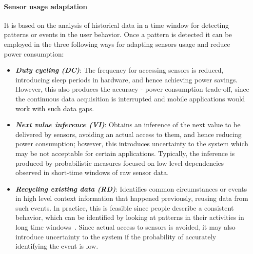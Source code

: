 \documentclass[ENG,PhD]{cinvestav}
\begin{document}
\paragraph{Sensor usage adaptation}
It is based on the analysis of historical data in a time window for detecting patterns or events in the user behavior.
Once a pattern is detected it can be employed in the three following ways for adapting sensors usage and reduce power consumption:
\begin{itemize}
  \item \emph{\textbf{Duty cycling (DC)}}:  The frequency for accessing sensors is reduced, introducing sleep periods in hardware, and hence achieving power savings.
  However, this also produces the accuracy - power consumption trade-off, since the continuous data acquisition is interrupted and mobile applications would work with such data gaps.
  \item \emph{\textbf{Next value inference (VI)}}: Obtains an inference of the next value to be delivered by sensors, avoiding an actual access to them, and hence reducing power consumption; however, this introduces uncertainty to the system which may be not acceptable for certain applications.
  Typically, the inference is produced by probabilistic measures focused on low level dependencies observed in short-time windows of raw sensor data.
  \item \emph{\textbf{Recycling existing data (RD)}}: Identifies common circumstances or events in high level context information that happened previously, reusing data from such events.
  In practice, this is feasible since people describe a consistent behavior, which can be identified by looking at patterns in their activities in long time windows~\cite{Chon2011,Paek2011}.
  Since actual access to sensors is avoided, it may also introduce uncertainty to the system if the probability of accurately identifying the event is low.
\end{itemize}
\end{document}
